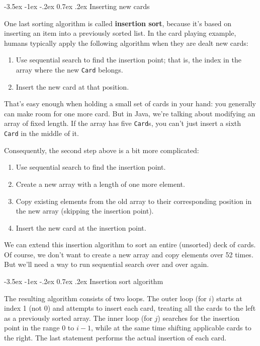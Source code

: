 \documentclass[12pt]{book}
\makeatletter
\theoremstyle{exercise}
\newcommand{\java}[1]{\verb"#1"}
\renewcommand{\section}{\@startsection{section}{1}{\z@}%
    {-3.5ex \@plus -1ex \@minus -.2ex}%
    {0.7ex \@plus.2ex}%
    {\normalfont\Large\bfseries}}
\newcommand{\java}[1]{\lstinline{#1}} %
\makeatother
\begin{document}
\section{Inserting new cards}


One last sorting algorithm is called {\bf insertion sort}, because it's based on inserting an item into a previously sorted list.
In the card playing example, humans typically apply the following algorithm when they are dealt new cards:

\begin{enumerate}
\item Use sequential search to find the insertion point; that is, the index in the array where the new \java{Card} belongs.
\item Insert the new card at that position.
\end{enumerate}

That's easy enough when holding a small set of cards in your hand: you generally can make room for one more card.
But in Java, we're talking about modifying an array of fixed length.
If the array has five \java{Card}s, you can't just insert a sixth \java{Card} in the middle of it.

Consequently, the second step above is a bit more complicated:

\begin{enumerate}
\item Use sequential search to find the insertion point.
\item Create a new array with a length of one more element.
\item Copy existing elements from the old array to their corresponding position in the new array (skipping the insertion point).
\item Insert the new card at the insertion point.
\end{enumerate}

We can extend this insertion algorithm to sort an entire (unsorted) deck of cards.
Of course, we don't want to create a new array and copy elements over 52 times.
But we'll need a way to run sequential search over and over again.


\section{Insertion sort algorithm}

The resulting algorithm consists of two loops.
The outer loop (for $i$) starts at index 1 (not 0) and attempts to insert each card, treating all the cards to the left as a previously sorted array.
The inner loop (for $j$) searches for the insertion point in the range $0$ to $i-1$, while at the same time shifting applicable cards to the right.
The last statement performs the actual insertion of each card.
\end{document}
